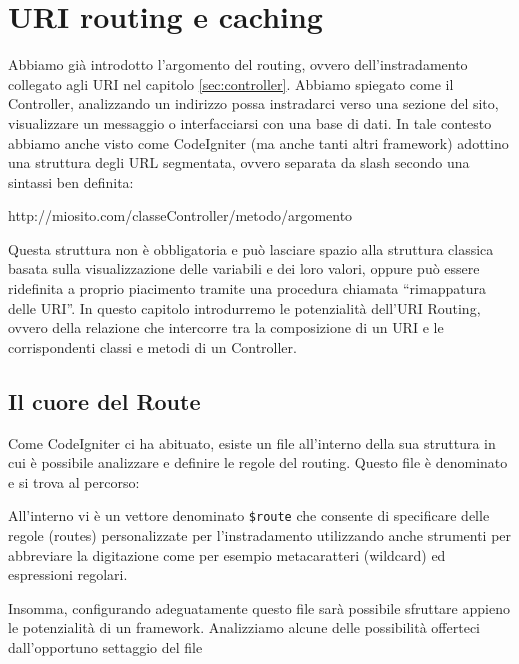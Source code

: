 \chapter{URI routing e caching}
\label{cap:uri}

Abbiamo già introdotto l'argomento del routing, ovvero dell'instradamento collegato agli \ac{URI} nel capitolo \vref{sec:controller}. Abbiamo spiegato come il Controller, analizzando un indirizzo possa instradarci verso una sezione del sito, visualizzare un messaggio o interfacciarsi con una base di dati. In tale contesto abbiamo anche visto come CodeIgniter (ma anche tanti altri framework) adottino una struttura degli \ac{URL} segmentata, ovvero separata da slash secondo una sintassi ben definita:

\begin{code}
http://miosito.com/classeController/metodo/argomento
\end{code}

Questa struttura non è obbligatoria e può lasciare spazio alla struttura classica basata sulla visualizzazione delle variabili e dei loro valori, oppure può essere ridefinita a proprio piacimento tramite una procedura chiamata ``rimappatura delle \ac{URI}''. In questo capitolo introdurremo le potenzialità dell'URI Routing, ovvero della relazione che intercorre tra la composizione di un \ac{URI} e le corrispondenti classi e metodi di un Controller.

\section{Il cuore del Route}
Come CodeIgniter ci ha abituato, esiste un file all'interno della sua struttura in cui è possibile analizzare e definire le regole del routing. Questo file è denominato  e si trova al percorso:


All'interno vi è un vettore denominato \verb|$route| che consente di specificare delle regole (routes) personalizzate per l'instradamento utilizzando anche strumenti per abbreviare la digitazione come per esempio metacaratteri (wildcard) ed espressioni regolari. 

Insomma, configurando adeguatamente questo file sarà possibile sfruttare appieno le potenzialità di un framework. Analizziamo alcune delle possibilità offerteci dall'opportuno settaggio del file 

